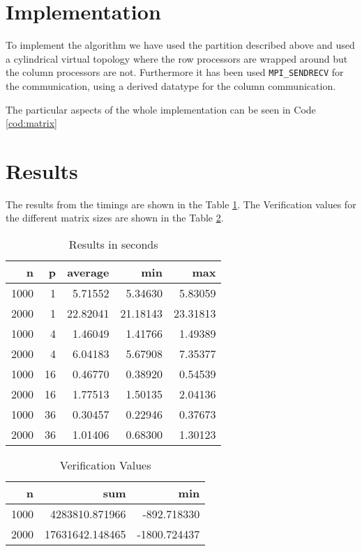 \documentclass[a4paper]{article}
\begin{document}
\section{Implementation}
    To implement the algorithm we have used the partition described above and used a cylindrical virtual topology where the row processors are wrapped around but the column processors are not. Furthermore it has been used \texttt{MPI\_SENDRECV} for the communication, using a derived datatype for the column communication.

    The particular aspects of the whole implementation can be seen in Code \ref{cod:matrix}

\section{Results}
    The results from the timings are shown in the Table \ref{tab:Results}. The Verification values for the different matrix sizes are shown in the Table \ref{tab:Verification}.

    \begin{table}[!htp]
      \center
      \begin{tabular}{*{5}{r}}
        \textbf{n} &  \textbf{p} &   \textbf{average} &       \textbf{min} &       \textbf{max} \\
    \midrule
     1000 & 1 & 5.71552 & 5.34630 & 5.83059\\
     2000 & 1 & 22.82041 & 21.18143 & 23.31813\\
     1000 & 4 & 1.46049 & 1.41766 & 1.49389\\
     2000 & 4 & 6.04183 & 5.67908 & 7.35377\\
     1000 & 16 & 0.46770 & 0.38920 & 0.54539\\
     2000 & 16 & 1.77513 & 1.50135 & 2.04136\\
     1000 & 36 & 0.30457 & 0.22946 & 0.37673\\
     2000 & 36 & 1.01406 & 0.68300 & 1.30123\\
      \end{tabular}
      \caption{Results in seconds}
      \label{tab:Results}
    \end{table}
        
    \begin{table}[!htp]
      \center
      \begin{tabular}{*{3}{r}}
        \textbf{n} &   \textbf{sum} &       \textbf{min}\\
    \midrule
     1000 &  4283810.871966  & -892.718330   \\
     2000 & 17631642.148465  & -1800.724437  \\
      \end{tabular}
      \caption{Verification Values}
      \label{tab:Verification}
    \end{table}
\end{document}
